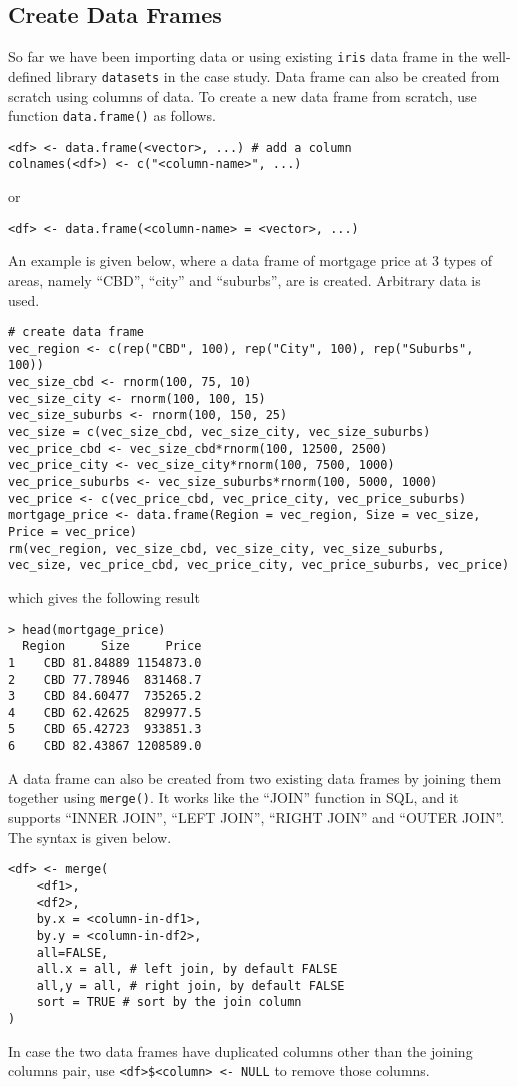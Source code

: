 \subsection{Create Data Frames}

So far we have been importing data or using existing \verb|iris| data frame in the well-defined library \verb|datasets| in the case study. Data frame can also be created from scratch using columns of data. To create a new data frame from scratch, use function \verb|data.frame()| as follows.
\begin{lstlisting}
<df> <- data.frame(<vector>, ...) # add a column
colnames(<df>) <- c("<column-name>", ...)
\end{lstlisting}
or
\begin{lstlisting}
<df> <- data.frame(<column-name> = <vector>, ...)
\end{lstlisting}

An example is given below, where a data frame of mortgage price at 3 types of areas, namely ``CBD'', ``city'' and ``suburbs'', are is created. Arbitrary data is used.
\begin{lstlisting}
# create data frame
vec_region <- c(rep("CBD", 100), rep("City", 100), rep("Suburbs", 100))
vec_size_cbd <- rnorm(100, 75, 10)
vec_size_city <- rnorm(100, 100, 15)
vec_size_suburbs <- rnorm(100, 150, 25)
vec_size = c(vec_size_cbd, vec_size_city, vec_size_suburbs)
vec_price_cbd <- vec_size_cbd*rnorm(100, 12500, 2500)
vec_price_city <- vec_size_city*rnorm(100, 7500, 1000)
vec_price_suburbs <- vec_size_suburbs*rnorm(100, 5000, 1000)
vec_price <- c(vec_price_cbd, vec_price_city, vec_price_suburbs)
mortgage_price <- data.frame(Region = vec_region, Size = vec_size, Price = vec_price)
rm(vec_region, vec_size_cbd, vec_size_city, vec_size_suburbs, vec_size, vec_price_cbd, vec_price_city, vec_price_suburbs, vec_price)
\end{lstlisting}
which gives the following result
\begin{lstlisting}
> head(mortgage_price)
  Region     Size     Price
1    CBD 81.84889 1154873.0
2    CBD 77.78946  831468.7
3    CBD 84.60477  735265.2
4    CBD 62.42625  829977.5
5    CBD 65.42723  933851.3
6    CBD 82.43867 1208589.0
\end{lstlisting}

A data frame can also be created from two existing data frames by joining them together using \verb|merge()|. It works like the ``JOIN'' function in SQL, and it supports ``INNER JOIN'', ``LEFT JOIN'', ``RIGHT JOIN'' and ``OUTER JOIN''. The syntax is given below.
\begin{lstlisting}
<df> <- merge(
    <df1>,
    <df2>,
    by.x = <column-in-df1>,
    by.y = <column-in-df2>,
    all=FALSE,
    all.x = all, # left join, by default FALSE
    all,y = all, # right join, by default FALSE
    sort = TRUE # sort by the join column
)
\end{lstlisting}
In case the two data frames have duplicated columns other than the joining columns pair, use \verb|<df>$<column> <- NULL| to remove those columns.

